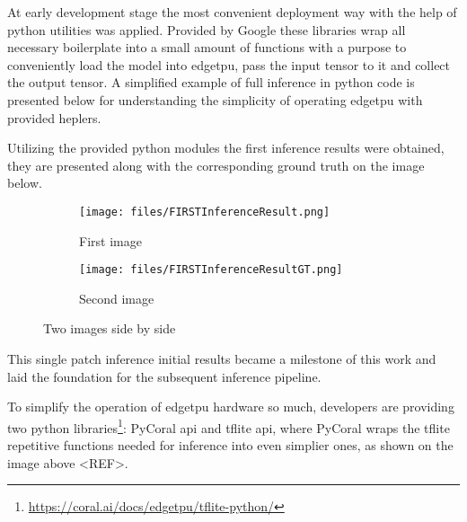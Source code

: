 {At early development stage the most convenient deployment way with the help of python utilities was applied.
Provided by Google these libraries wrap all necessary boilerplate into a small amount of functions with a purpose to conveniently load the model into \gls{edgetpu},
pass the input tensor to it and collect the output tensor. A simplified example of full inference in python code is presented below for understanding the simplicity of
operating \gls{edgetpu} with provided heplers.

%
%
%
%


Utilizing the provided python modules the first inference results were obtained, they are presented along with the corresponding ground truth on the image below.

\begin{figure}[htbp]
    \centering
    \begin{subfigure}{0.45\textwidth}
        \centering
        \texttt{[image: files/FIRSTInferenceResult.png]}
        \caption{First image}
    \end{subfigure}
    \hfill
    \begin{subfigure}{0.45\textwidth}
        \centering
        \texttt{[image: files/FIRSTInferenceResultGT.png]}
        \caption{Second image}
    \end{subfigure}
    \caption{Two images side by side}
    \label{fig:two-images}
\end{figure}

This single patch inference initial results became a milestone of this work and laid the foundation for the subsequent inference pipeline.

To simplify the operation of \gls{edgetpu} hardware so much, developers are providing two python libraries\footnote{\url{https://coral.ai/docs/edgetpu/tflite-python/}}:
PyCoral \gls{api} and \gls{tflite} \gls{api}, where PyCoral wraps the \gls{tflite} repetitive functions needed for inference into even simplier ones, as shown on the image above <REF>.

}
